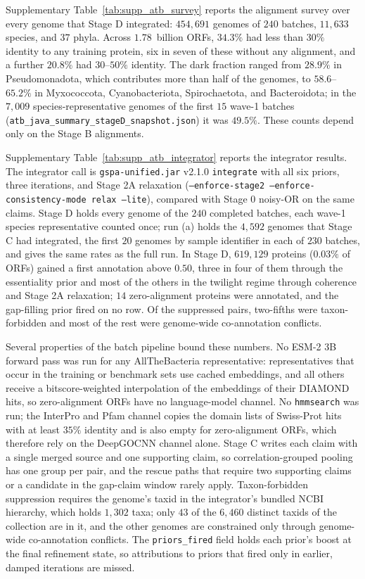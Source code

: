 \documentclass[10pt]{article}
\begin{document}
Supplementary Table~\ref{tab:supp_atb_survey} reports the alignment survey over every genome that Stage D integrated: $454{,}691$ genomes of $240$ batches, $11{,}633$ species, and $37$ phyla. Across $1.78$~billion ORFs, $34.3\%$ had less than $30\%$ identity to any training protein, six in seven of these without any alignment, and a further $20.8\%$ had $30$--$50\%$ identity. The dark fraction ranged from $28.9\%$ in Pseudomonadota, which contributes more than half of the genomes, to $58.6$--$65.2\%$ in Myxococcota, Cyanobacteriota, Spirochaetota, and Bacteroidota; in the $7{,}009$ species-representative genomes of the first $15$ wave-1 batches (\texttt{atb\_java\_summary\_stageD\_snapshot.json}) it was $49.5\%$. These counts depend only on the Stage B alignments.

Supplementary Table~\ref{tab:supp_atb_integrator} reports the integrator results. The integrator call is \texttt{gspa-unified.jar} v2.1.0 \texttt{integrate} with all six priors, three iterations, and Stage 2A relaxation (\texttt{--enforce-stage2 --enforce-consistency-mode relax --lite}), compared with Stage 0 noisy-OR on the same claims. Stage D holds every genome of the $240$ completed batches, each wave-1 species representative counted once; run (a) holds the $4{,}592$ genomes that Stage C had integrated, the first $20$ genomes by sample identifier in each of $230$ batches, and gives the same rates as the full run. In Stage D, $619{,}129$ proteins ($0.03\%$ of ORFs) gained a first annotation above $0.50$, three in four of them through the essentiality prior and most of the others in the twilight regime through coherence and Stage 2A relaxation; $14$ zero-alignment proteins were annotated, and the gap-filling prior fired on no row. Of the suppressed pairs, two-fifths were taxon-forbidden and most of the rest were genome-wide co-annotation conflicts.

Several properties of the batch pipeline bound these numbers. No ESM-2 3B forward pass was run for any AllTheBacteria representative: representatives that occur in the training or benchmark sets use cached embeddings, and all others receive a bitscore-weighted interpolation of the embeddings of their DIAMOND hits, so zero-alignment ORFs have no language-model channel. No \texttt{hmmsearch} was run; the InterPro and Pfam channel copies the domain lists of Swiss-Prot hits with at least $35\%$ identity and is also empty for zero-alignment ORFs, which therefore rely on the DeepGOCNN channel alone. Stage C writes each claim with a single merged source and one supporting claim, so correlation-grouped pooling has one group per pair, and the rescue paths that require two supporting claims or a candidate in the gap-claim window rarely apply. Taxon-forbidden suppression requires the genome's taxid in the integrator's bundled NCBI hierarchy, which holds $1{,}302$ taxa; only $43$ of the $6{,}460$ distinct taxids of the collection are in it, and the other genomes are constrained only through genome-wide co-annotation conflicts. The \texttt{priors\_fired} field holds each prior's boost at the final refinement state, so attributions to priors that fired only in earlier, damped iterations are missed.
\end{document}
